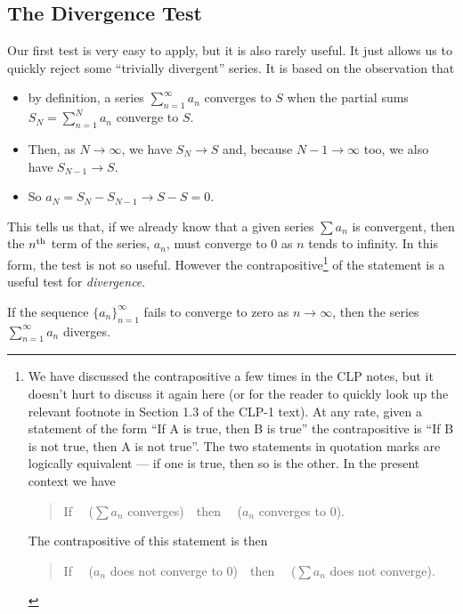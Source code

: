 \subsection{The Divergence Test}

Our first test is very easy to apply, but it is also rarely useful.
It just allows us to quickly reject some ``trivially divergent'' series.
It is based on the observation that
\begin{itemize}
\item  by definition, a series $\sum_{n=1}^\infty a_n$
converges to $S$ when the partial sums $S_N=\sum_{n=1}^N a_n$ converge
to  $S$.
\item Then, as $N\rightarrow\infty$, we have $S_N\rightarrow S$ and,
because $N-1\rightarrow\infty$ too, we also have $S_{N-1}\rightarrow S$.
\item
So $a_N=S_N-S_{N-1}\rightarrow S-S=0$.
\end{itemize}
This tells us that, if we already know that a given series $\sum a_n$
is convergent, then the $n^{\rm th}$ term of the series, $a_n$,
must converge to $0$ as $n$ tends to infinity. In this form,
the test is not so useful. However the
contrapositive\footnote{We have discussed the contrapositive a few times
in the CLP notes, but it doesn't hurt to discuss it again here (or for
the reader to quickly look up the relevant footnote in Section 1.3 of
the CLP-1 text).
At any rate, given a statement of the form ``If A is true, then B is true''
the contrapositive is ``If B is not true, then A is not true''.
The two statements in quotation marks are logically equivalent ---
if one is true, then so is the other. In the present context we have
\begin{quote}
 If \ \ ($\sum a_n$ converges)\ \  then \ \ ($a_n$ converges to $0$).
\end{quote}
The contrapositive of this statement is then
\begin{quote}
 If  \ \ ($a_n$ does not converge to 0)\ \  then
   \ \ ($\sum a_n$ does not converge).
\end{quote}
} of the statement is a useful test for \emph{divergence}.

\begin{theorem}\label{thm:SRdivergenceTest}
If the sequence $\big\{a_n\big\}_{n=1}^\infty$ fails to converge to zero
as $n\rightarrow\infty$, then the series $\sum_{n=1}^\infty a_n$ diverges.
\end{theorem}


